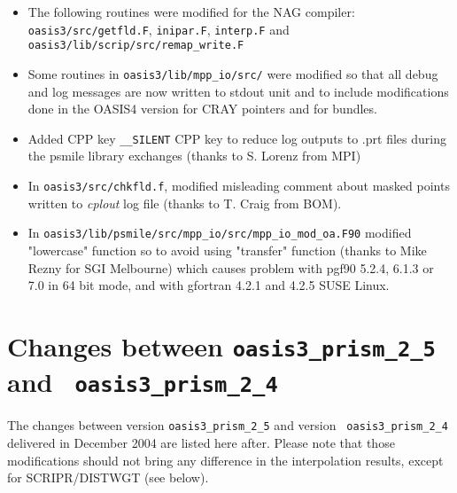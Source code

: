 \begin{itemize}
\begin{itemize}
  \item The following routines were modified for the NAG compiler:
  {\tt oasis3\break /src/getfld.F}, {\tt inipar.F}, {\tt interp.F} and 
  {\tt oasis3/lib/scrip/src/\break remap\_write.F}
 
  \item Some routines in {\tt oasis3/lib/mpp\_io/src/} were
  modified so that all debug and log messages are now written to
  stdout unit and to include modifications done in the OASIS4 version
  for CRAY pointers and for bundles.

  \item Added CPP key {\tt \_\_SILENT} CPP key to reduce log outputs to
  .prt files during the psmile library exchanges (thanks to S.
  Lorenz from MPI)

  \item In {\tt oasis3/src/chkfld.f}, modified
    misleading comment about masked points written to {\it cplout} log
    file (thanks to T. Craig from BOM).

  \item In  {\tt oasis3/lib/psmile/src/mpp\_io/src/mpp\_io\_mod\_oa.F90}
    modified "lowercase" function so to avoid using
    "transfer" function (thanks to Mike Rezny for SGI Melbourne) which
   causes problem with pgf90 5.2.4, 6.1.3 or 7.0 in 64 bit mode, and with
   gfortran 4.2.1 and 4.2.5 SUSE Linux.

  \end{itemize}

\end{itemize}

\section{Changes between {\tt oasis3\_prism\_2\_5} and {\tt
oasis3\_prism\_2\_4}}

The changes between version {\tt oasis3\_prism\_2\_5} and version {\tt
  oasis3\_prism\_2\_4} delivered in December 2004 are listed here
after. Please note that those modifications should not bring any
difference in the interpolation results, except for SCRIPR/DISTWGT
(see below).

